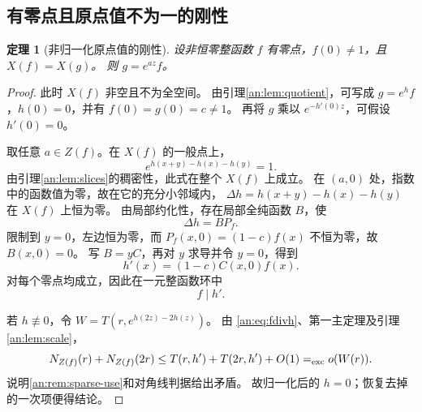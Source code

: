 \documentclass[11pt,a4paper,oneside,openany]{book}
\theoremstyle{lecture}
\newtheorem{theorem}{定理}[section]
\numberwithin{equation}{section}
\begin{document}
\subsection{有零点且原点值不为一的刚性}\label{an:sec:nonnormal}
\begin{theorem}[非归一化原点值的刚性]\label{an:thm:nonnormal}
设非恒零整函数 $f$ 有零点，$f(0)\ne1$，且 $X(f)=X(g)$。
则 $g=e^{az}f$。
\end{theorem}
\begin{proof}
此时 $X(f)$ 非空且不为全空间。
由引理\ref{an:lem:quotient}，可写成 $g=e^hf$，$h(0)=0$，并有 $f(0)=g(0)=c\ne1$。
再将 $g$ 乘以 $e^{-h'(0)z}$，可假设 $h'(0)=0$。

取任意 $a\in Z(f)$。在 $X(f)$ 的一般点上，
\[
 e^{h(x+y)-h(x)-h(y)}=1.
\]
由引理\ref{an:lem:slices}的稠密性，此式在整个 $X(f)$ 上成立。
在 $(a,0)$ 处，指数中的函数值为零，故在它的充分小邻域内，
$\Delta h=h(x+y)-h(x)-h(y)$ 在 $X(f)$ 上恒为零。
由局部约化性，存在局部全纯函数 $B$，使
\[
 \Delta h=B P_f.
\]
限制到 $y=0$，左边恒为零，而 $P_f(x,0)=(1-c)f(x)$ 不恒为零，故 $B(x,0)=0$。
写 $B=yC$，再对 $y$ 求导并令 $y=0$，得到
\[
 h'(x)=(1-c)C(x,0)f(x).
\]
对每个零点均成立，因此在一元整函数环中
\begin{equation}\label{an:eq:fdivh}
 f\mid h'.
\end{equation}

若 $h\not\equiv0$，令 $W=T(r,e^{h(2z)-2h(z)})$。
由 \eqref{an:eq:fdivh}、第一主定理及引理\ref{an:lem:scale}，
\[
 N_{Z(f)}(r)+N_{Z(f)}(2r)
 \le T(r,h')+T(2r,h')+O(1)=_{\rm exc}o(W(r)).
\]
说明\ref{an:rem:sparse-use}和对角线判据给出矛盾。
故归一化后的 $h=0$；恢复去掉的一次项便得结论。
\end{proof}
\end{document}
